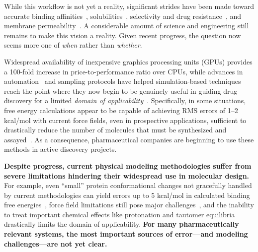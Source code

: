 \documentclass[11pt]{article}
\begin{document}
While this workflow is not yet a reality, significant strides have been made toward accurate binding affinities~\cite{mobley_perspective_2012, christ_accuracy_2014, deng_distinguishing_2015, sherborne_preprint_2016, schrodinger_accurate_2015, christ_binding_2016, cui_affinity_2016, verras_free_2016}, solubilities~\cite{Schnieders:2012:J.Chem.TheoryComput., park_absolute_2014, liu_using_2016}, selectivity and drug resistance~\cite{leonis_contribution_2013}, and membrane permeability~\cite{lee_permeability_2016, comer_permeability_2014}. 
A considerable amount of science and engineering still remains to make this vision a reality.
Given recent progress, the question now seems more one of \emph{when} rather than \emph{whether}.

Widespread availability of inexpensive graphics processing units (GPUs) provides a 100-fold increase in price-to-performance ratio over CPUs, while advances in automation~\cite{liu_lead_2013} and sampling protocols have helped simulation-based techniques reach the point where they now begin to be genuinely useful in guiding drug discovery for a limited \emph{domain of applicability}~\cite{mikulskis_large-scale_2014, homeyer_binding_2014, sherborne_preprint_2016,  schrodinger_accurate_2015, christ_binding_2016, cui_affinity_2016, verras_free_2016}.
Specifically, in some situations, free energy calculations appear to be capable of achieving RMS errors of 1--2 kcal/mol with current force fields, even in prospective applications, sufficient to drastically reduce the number of molecules that must be synthesized and assayed~\cite{shirts_free-energy_2010}.
As a consequence, pharmaceutical companies are beginning to use these methods in active discovery projects.

\textbf{Despite progress, current physical modeling methodologies suffer from severe limitations hindering their widespread use in molecular design.}
For example, even ``small'' protein conformational changes not gracefully handled by current methodologies can yield errors up to 5 kcal/mol in calculated binding free energies~\cite{lim_sensitivity_2016}, force field limitations still pose major challenges~\cite{rocklin_blind_2013}, and the inability to treat important chemical effects like protonation and tautomer equilibria drastically limits the domain of applicability.
{\bf For many pharmaceutically relevant systems, the most important sources of error---and modeling challenges---are not yet clear.}
\end{document}

